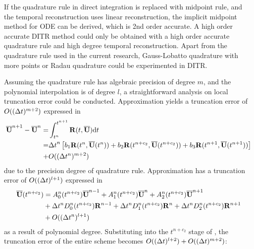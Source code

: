 If the quadrature rule in direct integration is replaced with
midpoint rule, and the temporal reconstruction uses linear
reconstruction, the implicit midpoint method for ODE can be derived,
which is 2nd order accurate. A high order accurate DITR method could
only be obtained with a high order accurate quadrature rule and
high degree temporal reconstruction.
Apart from the quadrature rule used in the current research,
Gauss-Lobatto quadrature with more points or Radau quadrature
could be experimented in DITR.

Assuming the quadrature rule has algebraic precision
of degree $m$, and the polynomial interpolation is of degree $l$,
a straightforward analysis on local truncation error could be conducted.
Approximation  yields a
truncation error of $O(({\Delta} t)^{m+2} )$ expressed in 
\begin{equation}
    \label{eq:Quad3Err}
    \begin{aligned}
        \overline{\mathbf{U}}^{n+1} - \overline{\mathbf{U}}^{n} = & \int_{t^n}^{t^{n+1}}{
        \mathbf{R}(t, \overline{\mathbf{U}})\dd t}                              \\  = &
        {{\Delta} t}^{n}
        \left[
            b_1\mathbf{R}(t^n, \overline{\mathbf{U}}(t^n))
            +
            b_2\mathbf{R}(t^{n+c_2}, \overline{\mathbf{U}}(t^{n+c_2}))
            +
            b_3\mathbf{R}(t^{n+1}, \overline{\mathbf{U}}(t^{n+1}))
            \right]
        \\ + &
        O(({\Delta} t^{n})^{m+2} )
    \end{aligned}
\end{equation}
due to the precision degree of quadrature rule.
Approximation
 has a truncation error of $O(({\Delta} t)^{l+1})$
expressed in 
\begin{equation}
    \begin{aligned}
        \label{eq:TRErr}
        \overline{\mathbf{U}}(t^{n+c_2}) & =
        A^n_0(t^{n+c_2})\overline{\mathbf{U}}^{n - 1} +
        A^n_1(t^{n+c_2})\overline{\mathbf{U}}^{n} +
        A^n_2(t^{n+c_2})\overline{\mathbf{U}}^{n + 1}
        \\ & +
        {\Delta} t^n D^n_0(t^{n+c_2})\mathbf{R}^{n - 1} +
        {\Delta} t^n D^n_1(t^{n+c_2})\mathbf{R}^{n} +
        {\Delta} t^n D^n_2(t^{n+c_2})\mathbf{R}^{n + 1}
        \\ & +
        O(({\Delta} t^{n})^{l+1} )
    \end{aligned}
\end{equation}
as a result of polynomial degree.
Substituting  into the $t^{n+c_2}$ stage
of , the truncation error
of the entire scheme becomes $O(({\Delta} t)^{l+2}) + O(({\Delta} t)^{m+2})$:
